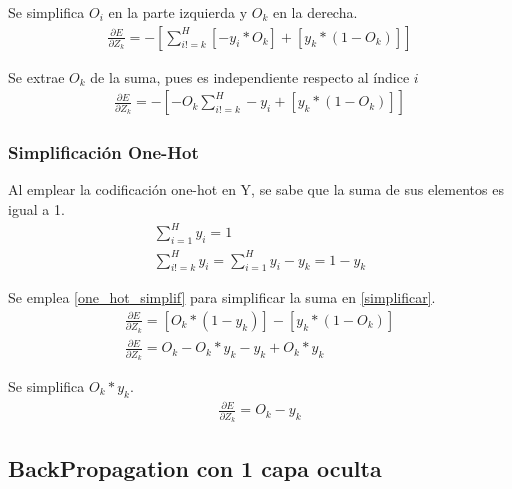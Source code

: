 Se simplifica $O_i$ en la parte izquierda y $O_k$ en la derecha. \\
\begin{gather}
	\frac{\partial E}{\partial Z_k} = - [\sum_{i!=k}^{H} [- y_i * O_k] + [y_k * (1 - O_k) ] ] 
\end{gather}

Se extrae $O_k$ de la suma, pues es independiente respecto al índice $i$ \\
\begin{gather}	
	\frac{\partial E}{\partial Z_k} = - [-O_k \sum_{i!=k}^{H}- y_i + [y_k * (1 - O_k) ] ]
	\label{simplificar}
\end{gather}

\subsubsection{Simplificación One-Hot}

Al emplear la codificación one-hot en Y, se sabe que la suma de sus elementos es igual a 1. \\
\begin{gather}
	\sum_{i=1}^{H} y_i = 1 \\
	\sum_{i!=k}^{H} y_i = \sum_{i=1}^{H} y_i - y_k = 1 - y_k
	\label{one_hot_simplif}
\end{gather}

Se emplea \ref{one_hot_simplif} para simplificar la suma en \ref{simplificar}. \\


\begin{gather}
	\frac{\partial E}{\partial Z_k} = [O_k*(1-y_k)] - [y_k*(1-O_k)] \\
	\frac{\partial E}{\partial Z_k} = O_k - O_k * y_k - y_k + O_k * y_k 
\end{gather}

Se simplifica $O_k*y_k$. \\
\begin{gather}
	\frac{\partial E}{\partial Z_k} = O_k - y_k
\end{gather}

\subsection{BackPropagation con 1 capa oculta}

